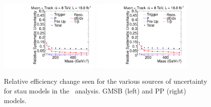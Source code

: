 \begin{figure}
\centering
  \includegraphics[clip=true, trim=0.0cm 0cm 2.8cm 0cm, width=0.44\textwidth]{figures/tkmu/MuGMStauUncertainty}
  \includegraphics[clip=true, trim=0.0cm 0cm 2.8cm 0cm, width=0.44\textwidth]{figures/tkmu/MuPPStauUncertainty} \\
\caption{Relative efficiency change seen for the various sources of uncertainty for stau models in the \tktof\ analysis.
GMSB (left) and PP (right) models.
    \label{fig:TkMuStauUncSource}}
\end{figure}

